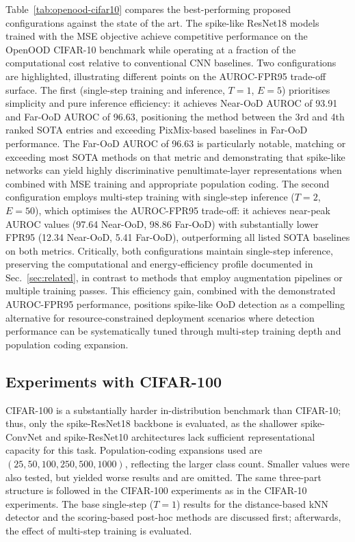 \documentclass{ieeeaccess}
\begin{document}
Table~\ref{tab:openood-cifar10} compares the best-performing proposed configurations against the state of the art. The spike-like ResNet18 models trained with the MSE objective achieve competitive performance on the OpenOOD CIFAR-10 benchmark while operating at a fraction of the computational cost relative to conventional CNN baselines. Two configurations are highlighted, illustrating different points on the AUROC-FPR95 trade-off surface. The first (single-step training and inference, $T=1$, $E=5$) prioritises simplicity and pure inference efficiency: it achieves Near-OoD AUROC of 93.91 and Far-OoD AUROC of 96.63, positioning the method between the 3rd and 4th ranked SOTA entries and exceeding PixMix-based baselines in Far-OoD performance. The Far-OoD AUROC of 96.63 is particularly notable, matching or exceeding most SOTA methods on that metric and demonstrating that spike-like networks can yield highly discriminative penultimate-layer representations when combined with MSE training and appropriate population coding. The second configuration employs multi-step training with single-step inference ($T=2$, $E=50$), which optimises the AUROC-FPR95 trade-off: it achieves near-peak AUROC values (97.64 Near-OoD, 98.86 Far-OoD) with substantially lower FPR95 (12.34 Near-OoD, 5.41 Far-OoD), outperforming all listed SOTA baselines on both metrics. Critically, both configurations maintain single-step inference, preserving the computational and energy-efficiency profile documented in Sec.~\ref{sec:related}, in contrast to methods that employ augmentation pipelines or multiple training passes. This efficiency gain, combined with the demonstrated AUROC-FPR95 performance, positions spike-like OoD detection as a compelling alternative for resource-constrained deployment scenarios where detection performance can be systematically tuned through multi-step training depth and population coding expansion.

\subsection{Experiments with CIFAR-100}

CIFAR-100 is a substantially harder in-distribution benchmark than CIFAR-10; thus, only the spike-ResNet18 backbone is evaluated, as the shallower spike-ConvNet and spike-ResNet10 architectures lack sufficient representational capacity for this task. Population-coding expansions used are $(25, 50, 100, 250, 500, 1000)$, reflecting the larger class count. Smaller values were also tested, but yielded worse results and are omitted. The same three-part structure is followed in the CIFAR-100 experiments as in the CIFAR-10 experiments. The base single-step ($T=1$) results for the distance-based kNN detector and the scoring-based post-hoc methods are discussed first; afterwards, the effect of multi-step training is evaluated.
\end{document}
